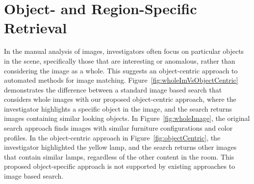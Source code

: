 
\chapter{Object- and Region-Specific Retrieval}
\label{ch:8}
In the manual analysis of images, investigators often focus on particular objects in the scene, specifically those that are interesting or anomalous, rather than considering the image as a whole. This suggests an object-centric approach to automated methods for image matching. Figure~\ref{fig:wholeImVsObjectCentric} demonstrates the difference between a standard image based search that considers whole images with our proposed object-centric approach, where the investigator highlights a specific object in the image, and the search returns images containing similar looking objects. In Figure~\ref{fig:wholeImage}, the original search approach finds images with similar furniture configurations and color profiles. In the object-centric approach in Figure~\ref{fig:objectCentric}, the investigator highlighted the yellow lamp, and the search returns other images that contain similar lamps, regardless of the other content in the room. This proposed object-specific approach is not supported by existing approaches to image based search.

